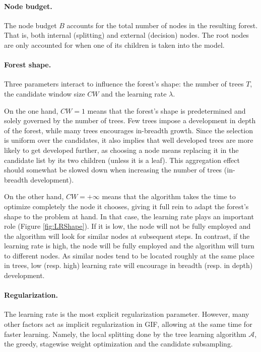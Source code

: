 \documentclass{article}
\begin{document}
\paragraph{Node budget.}
The node budget $B$ accounts for the total number of nodes in the resulting 
forest. That is, both internal (splitting) and external (decision) nodes. The 
root nodes are only accounted for when one of its children is taken into the 
model.

\paragraph{Forest shape.}
Three parameters interact to influence the forest's shape: the number of trees 
$T$, the candidate window size $CW$ and the learning rate $\lambda$. 

On the one hand, $CW=1$ means that the forest's shape is predetermined and 
solely governed by the number of trees. Few trees impose a development in 
depth of the forest, while many trees encourages in-breadth growth. Since the 
selection is uniform over the candidates, it also implies that well developed 
trees are more likely to get developed further, as choosing a node means 
replacing it in the candidate list by its two children (unless it is a leaf). 
This aggregation effect should somewhat be slowed down when increasing the 
number of trees (in-breadth development).

On the other hand, $CW=+\infty$ means that the algorithm takes the 
time to optimize completely the node it chooses, giving it full rein to adapt 
the forest's shape to the problem at hand. In that case, the learning rate 
plays an important role (Figure \ref{fig:LRShape}). If it is low, the node will 
not be fully employed and the algorithm will look for similar nodes at 
subsequent steps.
In contrast, if the learning rate is high, the node will be fully employed
and the algorithm will turn to different nodes.
As similar nodes tend to be located roughly at the same place in trees, low 
(resp. high) learning rate will encourage in breadth (resp. in depth) 
development.

\paragraph{Regularization.}
The learning rate is the most explicit regularization parameter. However, many 
other factors act as implicit regularization in GIF, allowing at the same time 
for faster learning. 
Namely, the local splitting done by the tree learning algorithm $\mathcal{A}$, 
the greedy, stagewise weight optimization and the candidate subsampling.
\end{document}
